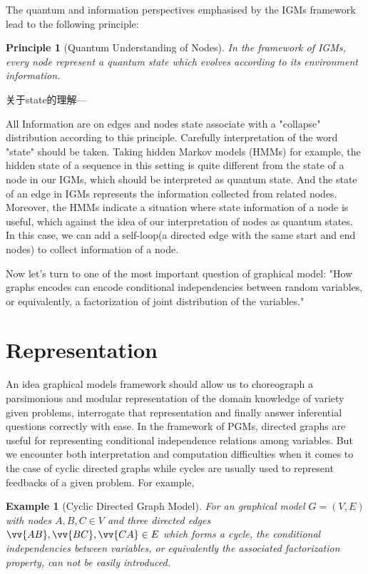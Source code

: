 \documentclass[10pt,onecolumn,letterpaper]{article}
\newtheorem{principle}[theorem]{Principle}
\newtheorem{example}{Example}[section]
\begin{document}
\begin{CJK*}{UTF8}{gbsn}
The quantum and information perspectives emphasised by the IGMs framework lead to the following principle:

\begin{principle}[Quantum Understanding of Nodes]
\label{prin:quantum}
In the framework of IGMs, every node represent a quantum state which evolves according to its environment information.
\end{principle}

关于state的理解---

All Information are on edges and nodes state associate with a "collapse" distribution according to this principle. Carefully interpretation of the word "state" should be taken. Taking hidden Markov models (HMMs) for example, the hidden state of a sequence in this setting is quite different from the state of a node in our IGMs, which should be interpreted as quantum state. And the state of an edge in IGMs represents the information collected from related nodes. Moreover, the HMMs indicate a situation where state information of a node is useful, which against the idea of our interpretation of nodes as quantum states. In this case, we can add a self-loop(a directed edge with the same start and end nodes) to collect information of a node.

Now let's turn to one of the most important question of graphical model: "How graphs encodes can encode conditional independencies between random variables, or equivalently, a factorization of joint distribution of the variables."

\section{Representation} \label{sec:repre}


An idea graphical models framework should allow us to choreograph a parsimonious and modular representation of the domain knowledge of variety given problems, interrogate that representation and finally answer inferential questions correctly with ease. 
In the framework of PGMs, directed graphs are useful for representing conditional independence relations among variables. %
But we encounter both interpretation and computation difficulties when it comes to the case of cyclic directed graphs while cycles are usually used to represent feedbacks of a given problem\cite{bongers2016theoretical}. For example, 

\begin{example}[Cyclic Directed Graph Model]
\label{eg:cycleDG}
For an graphical model $G=(V, E)$ with nodes $A, B, C \in V$ and three directed edges $\vv{AB}, \vv{BC}, \vv{CA} \in E$ which forms a cycle, the conditional independencies between variables, or equivalently the associated factorization property, can not be easily introduced.   
\end{example}


\end{CJK*}
\end{document}
